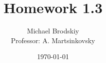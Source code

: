 


\title{Homework 1.3}
\date{\today}
\author{Michael Brodskiy\\ \small Professor: A. Martsinkovsky}



\maketitle

